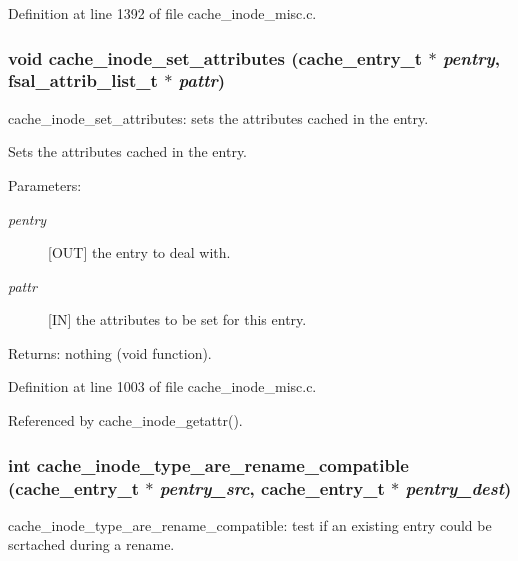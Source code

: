 Definition at line 1392 of file cache\_\-inode\_\-misc.c.
\subsubsection{\setlength{\rightskip}{0pt plus 5cm}void cache\_\-inode\_\-set\_\-attributes (cache\_\-entry\_\-t $\ast$ {\em pentry}, fsal\_\-attrib\_\-list\_\-t $\ast$ {\em pattr})}\label{cache__inode__misc_8c_a8}


cache\_\-inode\_\-set\_\-attributes: sets the attributes cached in the entry.

Sets the attributes cached in the entry.

\begin{Desc}
\item[Parameters:]
\begin{description}
\item[{\em pentry}][OUT] the entry to deal with. \item[{\em pattr}][IN] the attributes to be set for this entry.\end{description}
\end{Desc}
\begin{Desc}
\item[Returns:]nothing (void function). \end{Desc}


Definition at line 1003 of file cache\_\-inode\_\-misc.c.

Referenced by cache\_\-inode\_\-getattr().
\subsubsection{\setlength{\rightskip}{0pt plus 5cm}int cache\_\-inode\_\-type\_\-are\_\-rename\_\-compatible (cache\_\-entry\_\-t $\ast$ {\em pentry\_\-src}, cache\_\-entry\_\-t $\ast$ {\em pentry\_\-dest})}\label{cache__inode__misc_8c_a11}


cache\_\-inode\_\-type\_\-are\_\-rename\_\-compatible: test if an existing entry could be scrtached during a rename.

